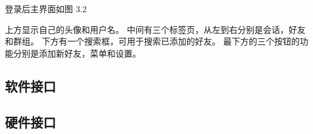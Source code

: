 登录后主界面如图 3.2

上方显示自己的头像和用户名。
中间有三个标签页，从左到右分别是会话，好友和群组。
下方有一个搜索框，可用于搜索已添加的好友。
最下方的三个按钮的功能分别是添加新好友，菜单和设置。


\subsection{软件接口}
% 
% 
% 
% 
% 
% 
% 

\subsection{硬件接口}
% 
% 
% 
% 
%  


